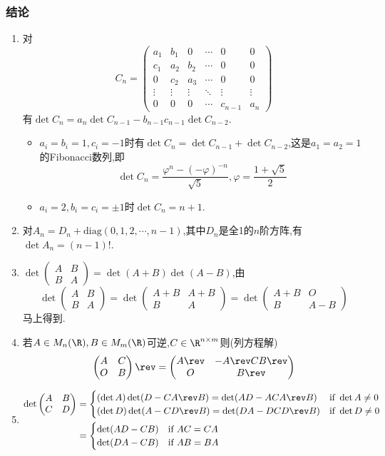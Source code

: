 \documentclass{article}
\newcommand{\matrixtwo}[4]{\begin{pmatrix}#1&#2\\#3&#4 \end{pmatrix}}
\theoremstyle{definition}
\begin{document}
\subsubsection{结论}
\begin{enumerate}
    \item 对$$C_n=\begin{pmatrix}
            a_1&b_1&0&\cdots&0&0\\
            c_1&a_2&b_2&\cdots&0&0\\
            0&c_2&a_3&\cdots&0&0\\
            \vdots&\vdots&\vdots&\ddots&\vdots&\vdots\\
            0&0&0&\cdots&c_{n-1}&a_n
    \end{pmatrix}$$有$\det C_n=a_n \det C_{n-1}-b_{n-1}c_{n-1}\det C_{n-2}$.
    \begin{itemize}
        \item $a_i=b_i=1, c_i=-1$时有$\det C_n=\det C_{n-1}+\det C_{n-2}$,这是$a_1=a_2=1$的Fibonacci数列,即$$\det C_n=\frac{\varphi^n-(-\varphi)^{-n}}{\sqrt{5}}, \varphi=\frac{1+\sqrt{5}}{2}$$
        \item $a_i=2, b_i=c_i=\pm 1$时$\det C_n=n+1$.
    \end{itemize}
    \item 对$A_n=D_n+\mathrm{diag}(0,1,2,\cdots,n-1)$,其中$D_{n}$是全1的$n$阶方阵,有$\det A_n=(n-1)!$.
    \item $\det \matrixtwo{A}{B}{B}{A}=\det (A+B)\det (A-B)$,由$$\det \matrixtwo{A}{B}{B}{A}=\det \matrixtwo{A+B}{A+B}{B}{A}=\det \matrixtwo{A+B}{O}{B}{A-B}$$马上得到.
    \item 若$A\in M_n(\R),B\in M_m(\R)$可逆,$C\in \R^{n\times m}$则(列方程解)$$\matrixtwo{A}{C}{O}{B}\rev=\matrixtwo{A\rev}{-A\rev CB\rev}{O}{B\rev}$$
    \item $$\begin{aligned}
        \det \matrixtwo{A}{B}{C}{D}&=
        \begin{cases}
            (\det A)\det (D-CA\rev B)=\det (AD-ACA\rev B)& \text{if } \det A\neq 0\\
            (\det D)\det (A-CD\rev B)=\det (DA-DCD\rev B)& \text{if } \det D\neq 0
        \end{cases}\\ 
    &=\begin{cases}
        \det (AD-CB)& \text{if } AC=CA\\
        \det (DA-CB)& \text{if } AB=BA
\end{cases}
\end{aligned}$$

\end{enumerate}
\end{document}
